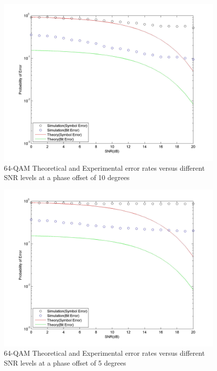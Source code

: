 \documentclass[]{article}
\begin{document}
\begin{figure}[H]
\centering
\hspace*{-2cm}\includegraphics[width=1.3\textwidth]{qam64SNRpo2.jpg}
\caption{64-QAM Theoretical and Experimental error rates versus different SNR levels at a phase offset of 10 degrees }
\end{figure}

\begin{figure}[H]
\centering
\hspace*{-2cm}\includegraphics[width=1.3\textwidth]{qam64SNRpo3.jpg}
\caption{64-QAM Theoretical and Experimental error rates versus different SNR levels at a phase offset of 5 degrees }
\end{figure}
\end{document}
